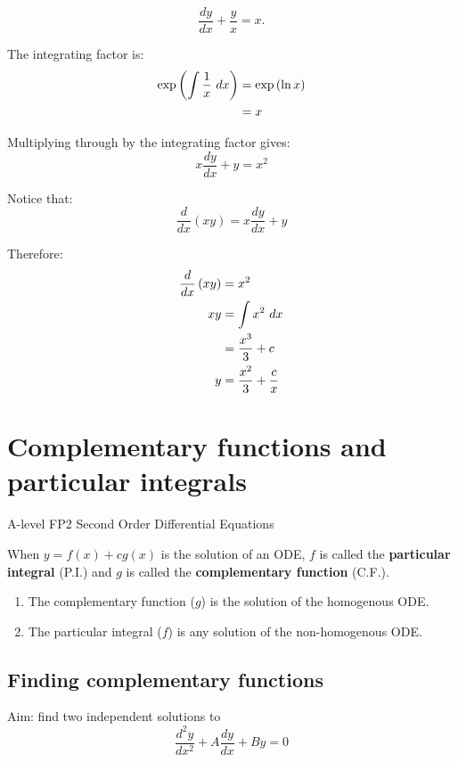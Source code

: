 \documentclass[11pt,a4paper,oneside]{book}
\begin{document}
\begin{example}
\[\frac{dy}{dx}+\frac{y}{x}=x.\]

The integrating factor is:
\begin{align*}
\exp\left(\int\frac{1}{x}\ dx\right)
&=\exp\left(\ln x\right)\\
&=x
\end{align*}

Multiplying through by the integrating factor gives:
\[x\frac{dy}{dx}+y=x^2\]

Notice that: \[\frac{d}{dx}\left(xy\right) = x\frac{dy}{dx}+y\]

Therefore:
\begin{align*}
\frac{d}{dx}\left(xy\right) &= x^2\\
xy &= \int x^2\ dx\\
&= \frac{x^3}{3} +c\\
y &= \frac{x^2}{3} +\frac{c}{x}\\
\end{align*}

\end{example}

\section{Complementary functions and particular integrals}
\begin{gce}
A-level FP2 Second Order Differential Equations
\end{gce}
\begin{definition}
When \(y=f(x) + cg(x)\) is the solution of an ODE, \(f\) is called the \textbf{particular integral} (P.I.) and \(g\) is called the \textbf{complementary function} (C.F.).
\end{definition}

\begin{enumerate}
\item The complementary function ($g$) is the solution of the homogenous ODE.
\item The particular integral ($f$) is any solution of the non-homogenous ODE.
\end{enumerate}

\subsection{Finding complementary functions}

Aim: find two independent solutions to 
\[\frac{d^2y}{dx^2} + A\frac{dy}{dx} + By = 0\]
\end{document}
